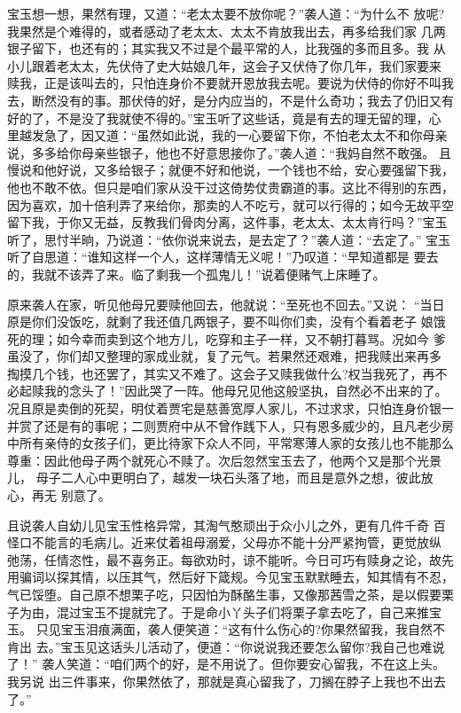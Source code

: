 宝玉想一想，果然有理，又道：“老太太要不放你呢？”袭人道：“为什么不
放呢?我果然是个难得的，或者感动了老太太、太太不肯放我出去，再多给我们家
几两银子留下，也还有的；其实我又不过是个最平常的人，比我强的多而且多。我
从小儿跟着老太太，先伏侍了史大姑娘几年，这会子又伏侍了你几年，我们家要来
赎我，正是该叫去的，只怕连身价不要就开恩放我去呢。要说为伏侍的你好不叫我
去，断然没有的事。那伏侍的好，是分内应当的，不是什么奇功；我去了仍旧又有
好的了，不是没了我就使不得的。”宝玉听了这些话，竟是有去的理无留的理，心
里越发急了，因又道：“虽然如此说，我的一心要留下你，不怕老太太不和你母亲
说，多多给你母亲些银子，他也不好意思接你了。”袭人道：“我妈自然不敢强。
且慢说和他好说，又多给银子；就便不好和他说，一个钱也不给，安心要强留下我，
他也不敢不依。但只是咱们家从没干过这倚势仗贵霸道的事。这比不得别的东西，
因为喜欢，加十倍利弄了来给你，那卖的人不吃亏，就可以行得的；如今无故平空
留下我，于你又无益，反教我们骨肉分离，这件事，老太太、太太肯行吗？”宝玉
听了，思忖半晌，乃说道：“依你说来说去，是去定了？”袭人道：“去定了。”
宝玉听了自思道：“谁知这样一个人，这样薄情无义呢！”乃叹道：“早知道都是
要去的，我就不该弄了来。临了剩我一个孤鬼儿！”说着便赌气上床睡了。

原来袭人在家，听见他母兄要赎他回去，他就说：“至死也不回去。”又说：
“当日原是你们没饭吃，就剩了我还值几两银子，要不叫你们卖，没有个看着老子
娘饿死的理；如今幸而卖到这个地方儿，吃穿和主子一样，又不朝打暮骂。况如今
爹虽没了，你们却又整理的家成业就，复了元气。若果然还艰难，把我赎出来再多
掏摸几个钱，也还罢了，其实又不难了。这会子又赎我做什么?权当我死了，再不
必起赎我的念头了！”因此哭了一阵。他母兄见他这般坚执，自然必不出来的了。
况且原是卖倒的死契，明仗着贾宅是慈善宽厚人家儿，不过求求，只怕连身价银一
并赏了还是有的事呢；二则贾府中从不曾作践下人，只有恩多威少的，且凡老少房
中所有亲侍的女孩子们，更比待家下众人不同，平常寒薄人家的女孩儿也不能那么
尊重：因此他母子两个就死心不赎了。次后忽然宝玉去了，他两个又是那个光景儿，
母子二人心中更明白了，越发一块石头落了地，而且是意外之想，彼此放心，再无
别意了。

且说袭人自幼儿见宝玉性格异常，其淘气憨顽出于众小儿之外，更有几件千奇
百怪口不能言的毛病儿。近来仗着祖母溺爱，父母亦不能十分严紧拘管，更觉放纵
弛荡，任情恣性，最不喜务正。每欲劝时，谅不能听。今日可巧有赎身之论，故先
用骗词以探其情，以压其气，然后好下箴规。今见宝玉默默睡去，知其情有不忍，
气已馁堕。自己原不想栗子吃，只因怕为酥酪生事，又像那茜雪之茶，是以假要栗
子为由，混过宝玉不提就完了。于是命小丫头子们将栗子拿去吃了，自己来推宝玉。
只见宝玉泪痕满面，袭人便笑道：“这有什么伤心的?你果然留我，我自然不肯出
去。”宝玉见这话头儿活动了，便道：“你说说我还要怎么留你?我自己也难说了！”
袭人笑道：“咱们两个的好，是不用说了。但你要安心留我，不在这上头。我另说
出三件事来，你果然依了，那就是真心留我了，刀搁在脖子上我也不出去了。”

